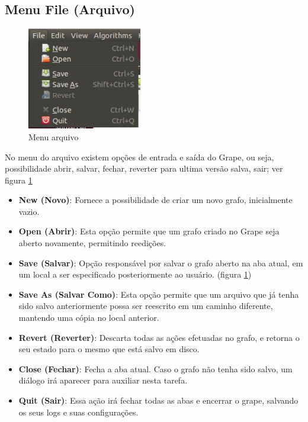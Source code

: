 \documentclass[a4paper]{abnt}
\begin{document}
\subsection{Menu File (Arquivo)}
\begin{figure}[htb]
    \centering
	\includegraphics[width=5cm]{grape_menu_file.png}
	\caption{Menu arquivo}
	\label{img_grape_menu_file}
\end{figure}

No menu do arquivo existem opções de entrada e saída do Grape, ou seja, possibilidade abrir, salvar, fechar, reverter para ultima versão salva, sair; ver figura \ref{img_grape_menu_file}
\begin{itemize}
    \item \textbf{New (Novo)}: Fornece a possibilidade de criar um novo grafo, inicialmente vazio.
    \item \textbf{Open (Abrir)}: Esta opção permite que um grafo criado no Grape seja aberto novamente, permitindo reedições.
    \item \textbf{Save (Salvar)}: Opção responsável por salvar o grafo aberto na aba atual, em um local a ser especificado posteriormente ao usuário. (figura \ref{img_grape_menu_file})
    \item \textbf{Save As (Salvar Como)}: Esta opção permite que um arquivo que já tenha sido salvo anteriormente possa ser reescrito em um caminho diferente, mantendo uma cópia no local anterior.
    \item \textbf{Revert (Reverter)}: Descarta todas as ações efetuadas no grafo, e retorna o seu estado para o mesmo que está salvo em disco.
    \item \textbf{Close (Fechar)}: Fecha a aba atual. Caso o grafo não tenha sido salvo, um diálogo irá aparecer para auxiliar nesta tarefa.
    \item \textbf{Quit (Sair)}: Essa ação irá fechar todas as abas e encerrar o grape, salvando os seus logs e suas configurações.
\end{itemize}
\end{document}
